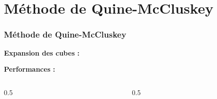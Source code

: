 \documentclass[handout]{beamer}
\newcommand{\tick}{\ding{52}}
\begin{document}
\section{M\'ethode de Quine-McCluskey}
\begin{frame}
  \frametitle{M\'ethode de Quine-McCluskey}
  
  \textbf{Expansion des cubes :}
  
     \begin{tikzpicture}[scale=2]
     
     \end{tikzpicture}

  \textbf{Performances :}     
     
     \begin{columns}
     	\begin{column}[t]{0.5\hsize}
	     \begin{tikzpicture}[scale=0.8]
    	 
	     \end{tikzpicture}
	     \end{column}

     
	     \begin{column}[t]{0.5\hsize}
	     \begin{tikzpicture}[scale=0.8]
    	 
	     \end{tikzpicture}
    	 \end{column} 
	  \end{columns}
%
%  
  
  
  
\end{frame}
\end{document}
